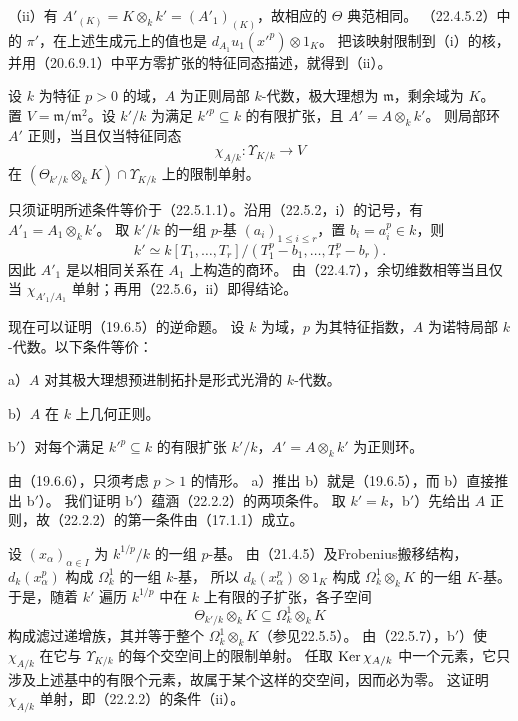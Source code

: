（ii）有 $A'_{(K)}=K\otimes_kk'=(A'_1)_{(K)}$，故相应的 $\Theta$ 典范相同。
（22.4.5.2）中的 $\pi'$，在上述生成元上的值也是 $d_{A_1}u_1(x'^p)\otimes1_K$。
把该映射限制到（i）的核，并用（20.6.9.1）中平方零扩张的特征同态描述，就得到（ii）。
\finishproof

设 $k$ 为特征 $p>0$ 的域，$A$ 为正则局部 $k$-代数，极大理想为 $\mathfrak m$，剩余域为 $K$。
置 $V=\mathfrak m/\mathfrak m^2$。设 $k'/k$ 为满足 $k'^p\subseteq k$ 的有限扩张，且 $A'=A\otimes_kk'$。
则局部环 $A'$ 正则，当且仅当特征同态
\[
 \chi_{A/k}:\Upsilon_{K/k}\longrightarrow V
\]
在 $(\Theta_{k'/k}\otimes_kK)\cap\Upsilon_{K/k}$ 上的限制单射。

\eproof
只须证明所述条件等价于（22.5.1.1）。沿用（22.5.2，i）的记号，有 $A'_1=A_1\otimes_kk'$。
取 $k'/k$ 的一组 $p$-基 $(a_i)_{1\le i\le r}$，置 $b_i=a_i^p\in k$，则
\[
 k'\simeq k[T_1,\ldots,T_r]/(T_1^p-b_1,\ldots,T_r^p-b_r).
\]
因此 $A'_1$ 是以相同关系在 $A_1$ 上构造的商环。
由（22.4.7），余切维数相等当且仅当 $\chi_{A'_1/A_1}$ 单射；再用（22.5.6，ii）即得结论。
\finishproof

现在可以证明（19.6.5）的逆命题。
设 $k$ 为域，$p$ 为其特征指数，$A$ 为诺特局部 $k$-代数。以下条件等价：

\noindent a）$A$ 对其极大理想预进制拓扑是形式光滑的 $k$-代数。

\noindent b）$A$ 在 $k$ 上几何正则。

\noindent b$'$）对每个满足 $k'^p\subseteq k$ 的有限扩张 $k'/k$，$A'=A\otimes_kk'$ 为正则环。

\eproof
由（19.6.6），只须考虑 $p>1$ 的情形。
a）推出 b）就是（19.6.5），而 b）直接推出 b$'$）。
我们证明 b$'$）蕴涵（22.2.2）的两项条件。
取 $k'=k$，b$'$）先给出 $A$ 正则，故（22.2.2）的第一条件由（17.1.1）成立。

设 $(x_\alpha)_{\alpha\in I}$ 为 $k^{1/p}/k$ 的一组 $p$-基。
由（21.4.5）及Frobenius搬移结构，$d_k(x_\alpha^p)$ 构成 $\Omega^1_k$ 的一组 $k$-基，
所以 $d_k(x_\alpha^p)\otimes1_K$ 构成 $\Omega^1_k\otimes_kK$ 的一组 $K$-基。
于是，随着 $k'$ 遍历 $k^{1/p}$ 中在 $k$ 上有限的子扩张，各子空间
\[
 \Theta_{k'/k}\otimes_kK\subseteq\Omega^1_k\otimes_kK
\]
构成滤过递增族，其并等于整个 $\Omega^1_k\otimes_kK$（参见22.5.5）。
由（22.5.7），b$'$）使 $\chi_{A/k}$ 在它与 $\Upsilon_{K/k}$ 的每个交空间上的限制单射。
任取 $\operatorname{Ker}\chi_{A/k}$ 中一个元素，它只涉及上述基中的有限个元素，故属于某个这样的交空间，因而必为零。
这证明 $\chi_{A/k}$ 单射，即（22.2.2）的条件（ii）。
\finishproof


